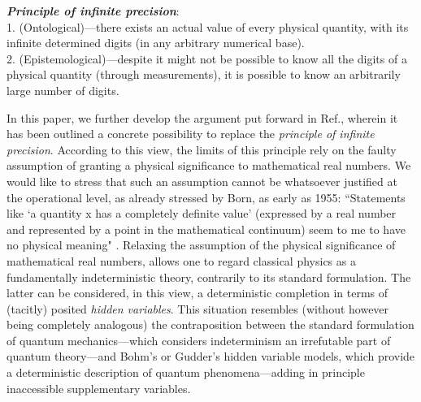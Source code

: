 \documentclass[12pt]{article}
\begin{document}
\textbf{\emph{Principle of infinite precision}}:\\
1. (Ontological)---there exists an actual value of every physical quantity, with its infinite determined digits (in any arbitrary numerical base).\\
2. (Epistemological)---despite it might not be possible to know all the digits of a physical quantity (through measurements), it is possible to know an arbitrarily large number of digits. 

In this paper, we further develop the argument put forward in Ref.\cite{gisin1}, wherein it has been outlined a concrete possibility to replace the \emph{principle of infinite precision}. According to this view, the limits of this principle rely on the faulty assumption of granting a physical significance to mathematical real numbers. We would like to stress that such an assumption cannot be whatsoever justified at the operational level, as already stressed by Born, as early as 1955: ``Statements like `a quantity x has a completely definite value' (expressed by a real number and represented by a point in the mathematical continuum) seem to me to have no physical meaning" \cite{born}. Relaxing the assumption of the physical significance of mathematical real numbers, allows one to regard classical physics as a fundamentally indeterministic theory, contrarily to its standard formulation. The latter can be considered, in this view, a deterministic completion in terms of (tacitly) posited \emph{hidden variables}. This situation resembles (without however being completely analogous) the contraposition between the standard formulation of quantum mechanics---which considers indeterminism an irrefutable part of quantum theory---and Bohm's \cite{bohm} or Gudder's \cite{gudder} hidden variable models, which provide a deterministic description of quantum phenomena---adding in principle inaccessible supplementary variables.
\end{document}

